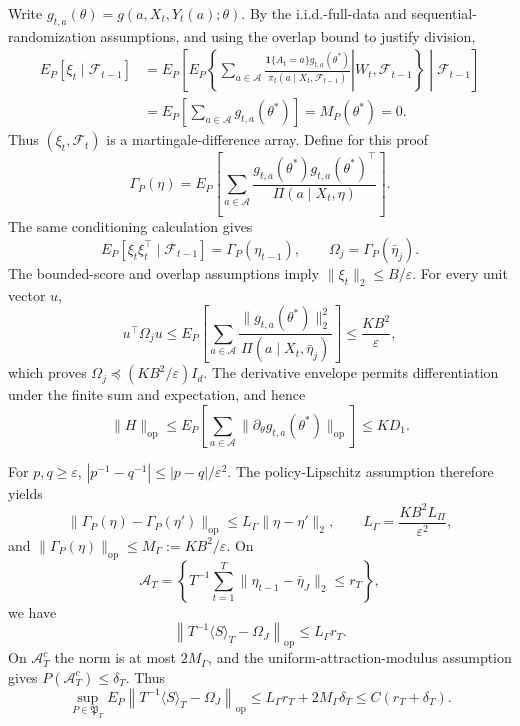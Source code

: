 Write \(g_{t,a}(\theta)=g(a,X_t,Y_t(a);\theta)\). By the i.i.d.-full-data and sequential-randomization assumptions, and using the overlap bound to justify division,
\[
\begin{aligned}
E_P[\xi_t\mid\mathcal F_{t-1}]
&=E_P\left[E_P\left\{\left.\sum_{a\in\mathcal A}
 \frac{\mathbf 1\{A_t=a\}g_{t,a}(\theta^*)}
 {\pi_t(a\mid X_t,\mathcal F_{t-1})}\right|W_t,\mathcal F_{t-1}\right\}\middle|\mathcal F_{t-1}\right]\\
&=E_P\left[\sum_{a\in\mathcal A}g_{t,a}(\theta^*)\right]
=M_P(\theta^*)=0.
\end{aligned}
\]
Thus \((\xi_t,\mathcal F_t)\) is a martingale-difference array. Define for this proof
\[
 \Gamma_P(\eta)=E_P\left[\sum_{a\in\mathcal A}
 \frac{g_{t,a}(\theta^*)g_{t,a}(\theta^*)^\top}
 {\Pi(a\mid X_t,\eta)}\right].
\]
The same conditioning calculation gives
\[
 E_P[\xi_t\xi_t^\top\mid\mathcal F_{t-1}]=\Gamma_P(\eta_{t-1}),
 \qquad \Omega_j=\Gamma_P(\bar\eta_j).
\]
The bounded-score and overlap assumptions imply \(\|\xi_t\|_2\le B/\varepsilon\). For every unit vector \(u\),
\[
 u^\top\Omega_ju
 \le E_P\left[\sum_{a\in\mathcal A}
 \frac{\|g_{t,a}(\theta^*)\|_2^2}{\Pi(a\mid X_t,\bar\eta_j)}\right]
 \le \frac{KB^2}{\varepsilon},
\]
which proves \(\Omega_j\preceq(KB^2/\varepsilon)I_d\). The derivative envelope permits differentiation under the finite sum and expectation, and hence
\[
 \|H\|_{\mathrm{op}}
 \le E_P\left[\sum_{a\in\mathcal A}\|\partial_\theta g_{t,a}(\theta^*)\|_{\mathrm{op}}\right]
 \le KD_1.
\]

For \(p,q\ge\varepsilon\), \(|p^{-1}-q^{-1}|\le|p-q|/\varepsilon^2\). The policy-Lipschitz assumption therefore yields
\[
 \|\Gamma_P(\eta)-\Gamma_P(\eta')\|_{\mathrm{op}}
 \le L_\Gamma\|\eta-\eta'\|_2,
 \qquad L_\Gamma=\frac{KB^2L_\Pi}{\varepsilon^2},
\]
and \(\|\Gamma_P(\eta)\|_{\mathrm{op}}\le M_\Gamma:=KB^2/\varepsilon\). On
\[
 \mathcal A_T=\left\{T^{-1}\sum_{t=1}^T
 \|\eta_{t-1}-\bar\eta_J\|_2\le r_T\right\},
\]
we have
\[
 \left\|T^{-1}\langle S\rangle_T-\Omega_J\right\|_{\mathrm{op}}
 \le L_\Gamma r_T.
\]
On \(\mathcal A_T^c\) the norm is at most \(2M_\Gamma\), and the uniform-attraction-modulus assumption gives \(P(\mathcal A_T^c)\le\delta_T\). Thus
\[
 \sup_{P\in\mathfrak P_T}E_P\left\|T^{-1}\langle S\rangle_T-\Omega_J\right\|_{\mathrm{op}}
 \le L_\Gamma r_T+2M_\Gamma\delta_T
 \le C(r_T+\delta_T).
\]

